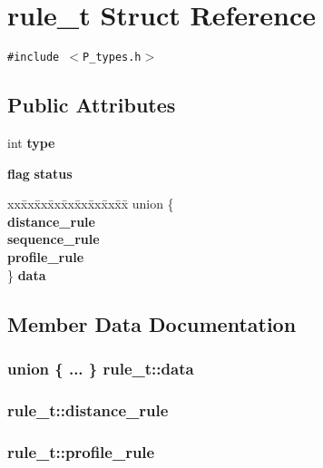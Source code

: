 \section{rule\_\-t  Struct Reference}
\label{structrule__t}
{\tt \#include $<$P\_\-types.h$>$}

\subsection*{Public Attributes}
\begin{CompactItemize}
\item 
int {\bf type}
\item 
{\bf flag} {\bf status}
\item 
\begin{tabbing}
xx\=xx\=xx\=xx\=xx\=xx\=xx\=xx\=xx\=\kill
union \{\\
 {\bf distance\_rule}\\
 {\bf sequence\_rule}\\
 {\bf profile\_rule}\\
\} {\bf data}
\end{tabbing}
\end{CompactItemize}


\subsection{Member Data Documentation}
\subsubsection{\setlength{\rightskip}{0pt plus 5cm}union \{ ... \}   rule\_\-t::data}\label{structrule__t_m5}


\subsubsection{ rule\_\-t::distance\_\-rule}\label{structrule__t_m2}


\subsubsection{ rule\_\-t::profile\_\-rule}\label{structrule__t_m4}


